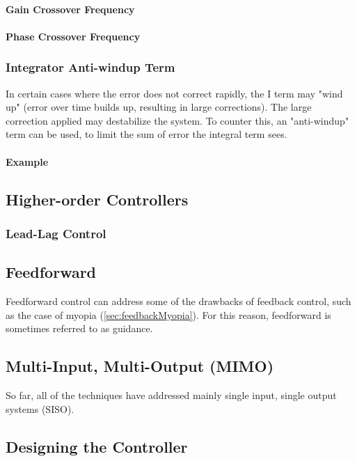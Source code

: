 \documentclass[../notes.tex]{subfiles}
\begin{document}
\paragraph{Gain Crossover Frequency}
\paragraph{Phase Crossover Frequency}



\subsubsection{Integrator Anti-windup Term}
In certain cases where the error does not correct rapidly, the I term may "wind up" (error over time builds up, resulting in large corrections). The large correction applied may destabilize the system. To counter this, an "anti-windup" term can be used, to limit the sum of error the integral term sees.
\paragraph{Example}

\subsection{Higher-order Controllers}
\subsubsection{Lead-Lag Control}
\subsection{Feedforward}
Feedforward control can address some of the drawbacks of feedback control, such as the case of myopia (\underline{\ref{sec:feedbackMyopia}}). For this reason, feedforward is sometimes referred to as guidance.

\subsection{Multi-Input, Multi-Output (MIMO)}
So far, all of the techniques have addressed mainly single input, single output systems (SISO).

\subsection{Designing the Controller}
\end{document}
